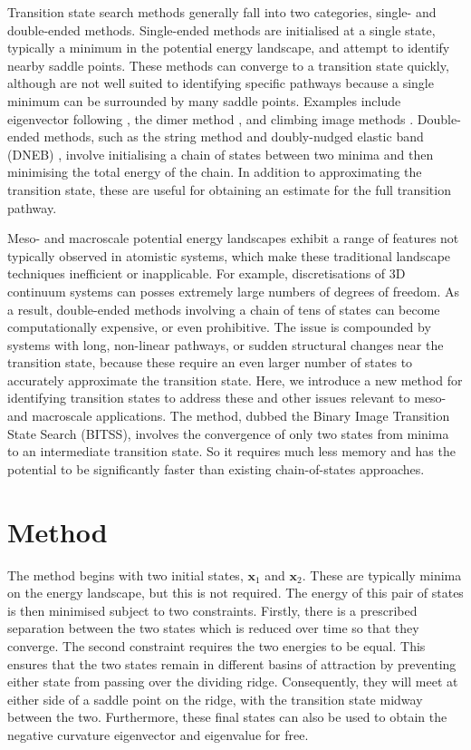 \documentclass[aps,twocolumn]{revtex4}
\begin{document}
Transition state search methods generally fall into two categories, single- and double-ended methods.
Single-ended methods are initialised at a single state, typically a minimum in the potential energy landscape, and attempt to identify nearby saddle points.
These methods can converge to a transition state quickly, although are not well suited to identifying specific pathways because a single minimum can be surrounded by many saddle points.
Examples include eigenvector following \cite{Cerjan1981}, the dimer method \cite{Heyden2005,Kastner2008}, and climbing image methods \cite{E2007,Ren2013}.
Double-ended methods, such as the string method \cite{E2002,E2007} and doubly-nudged elastic band (DNEB) \cite{Trygubenko2004}, involve initialising a chain of states between two minima and then minimising the total energy of the chain.
In addition to approximating the transition state, these are useful for obtaining an estimate for the full transition pathway.

Meso- and macroscale potential energy landscapes exhibit a range of features not typically observed in atomistic systems, which make these traditional landscape techniques inefficient or inapplicable.
For example, discretisations of 3D continuum systems can posses extremely large numbers of degrees of freedom.
As a result, double-ended methods involving a chain of tens of states can become computationally expensive, or even prohibitive.
The issue is compounded by systems with long, non-linear pathways, or sudden structural changes near the transition state, because these require an even larger number of states to accurately approximate the transition state.
Here, we introduce a new method for identifying transition states to address these and other issues relevant to meso- and macroscale applications.
The method, dubbed the Binary Image Transition State Search (BITSS), involves the convergence of only two states from minima to an intermediate transition state.
So it requires much less memory and has the potential to be significantly faster than existing chain-of-states approaches.


\section{Method}
The method begins with two initial states, $\bm{x}_1$ and $\bm{x}_2$.
These are typically minima on the energy landscape, but this is not required.
The energy of this pair of states is then minimised subject to two constraints.
Firstly, there is a prescribed separation between the two states which is reduced over time so that they converge.
The second constraint requires the two energies to be equal.
This ensures that the two states remain in different basins of attraction by preventing either state from passing over the dividing ridge.
Consequently, they will meet at either side of a saddle point on the ridge, with the transition state midway between the two.
Furthermore, these final states can also be used to obtain the negative curvature eigenvector and eigenvalue for free.
\end{document}
